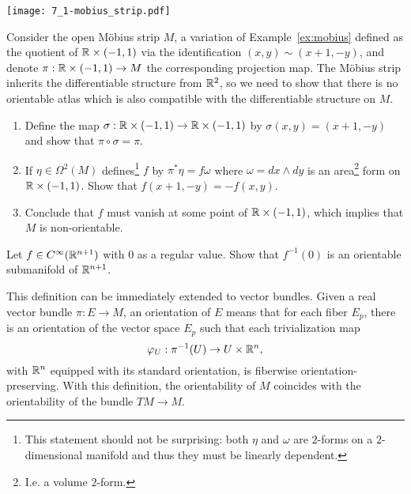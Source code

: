 \begin{marginfigure}
	\texttt{[image: 7\_1-mobius\_strip.pdf]}
\end{marginfigure}

\begin{exercise}
	Consider the open M\"obius strip $M$, a variation of Example~\ref{ex:mobius} defined as the quotient of $\mathbb{R}\times(-1,1)$ via the identification $(x,y) \sim (x+1, -y)$, and denote $\pi: \mathbb{R}\times(-1,1)\to M$ the corresponding projection map.
	The M\"obius strip inherits the differentiable structure from $\mathbb{R}^2$, so we need to show that there is no orientable atlas which is also compatible with the differentiable structure on $M$.
	\begin{enumerate}
		\item Define the map $\sigma:\mathbb{R}\times(-1,1)\to\mathbb{R}\times(-1,1)$ by $\sigma(x,y) = (x+1, -y)$ and show that $\pi\circ\sigma = \pi$.
		\item If $\eta\in\Omega^2(M)$ defines\footnote{This statement should not be surprising: both $\eta$ and $\omega$ are $2$-forms on a $2$-dimensional manifold and thus they must be linearly dependent.} $f$ by $\pi^* \eta = f \omega$ where $\omega = dx\wedge dy$ is an area\footnote{I.e. a volume $2$-form.} form on $\mathbb{R}\times(-1,1)$.
		      Show that $f(x+1, -y) = - f(x,y)$.
		\item Conclude that $f$ must vanish at some point of $\mathbb{R}\times(-1,1)$, which implies that $M$ is non-orientable.
	\end{enumerate}
\end{exercise}

\begin{exercise}
	Let $f\in C^\infty(\mathbb{R}^{n+1})$ with $0$ as a regular value.
	Show that $f^{-1}(0)$ is an orientable submanifold of $\mathbb{R}^{n+1}$.
\end{exercise}

\begin{remark}
	This definition can be immediately extended to vector bundles.
	Given a real vector bundle $\pi: E \to M$, an orientation of $E$ means that for each fiber $E_p$, there is an orientation of the vector space $E_p$ such that each trivialization map
	\begin{equation}
		\varphi_{U}:\pi^{-1}(U)\to U\times \mathbb{R}^{n},
	\end{equation}
	with $\mathbb{R}^n$ equipped with its standard orientation, is fiberwise orientation-preserving.
	With this definition, the orientability of $M$ coincides with the orientability of the bundle $TM\to M$.
\end{remark}

